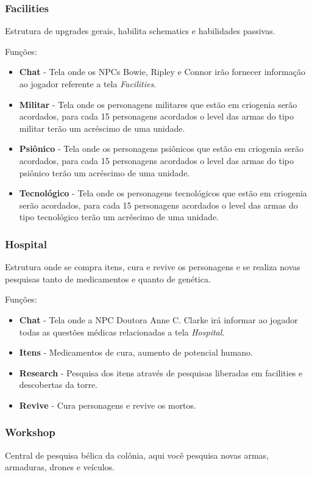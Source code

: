 \documentclass[11pt]{article} %
\begin{document}
\subsubsection{Facilities}
Estrutura de upgrades gerais, habilita schematics e habilidades passivas.

Funções:
\begin{itemize}
  \item \textbf{Chat} - Tela onde os NPCs Bowie, Ripley e Connor irão fornecer informação ao jogador referente a tela \textit{Facilities}.
  \item \textbf{Militar} - Tela onde os personagens militares que estão em criogenia serão acordados, para cada 15 personagens acordados o level das armas do tipo militar terão um acréscimo de uma unidade.
  \item \textbf{Psiônico} - Tela onde os personagens psiônicos que estão em criogenia serão acordados, para cada 15 personagens acordados o level das armas do tipo psiônico terão um acréscimo de uma unidade.
  \item \textbf{Tecnológico} - Tela onde os personagens tecnológicos que estão em criogenia serão acordados, para cada 15 personagens acordados o level das armas do tipo tecnológico terão um acréscimo de uma unidade.
\end{itemize}

\subsubsection{Hospital}
Estrutura onde se compra itens, cura e revive os personagens e se realiza novas pesquisas tanto de medicamentos e quanto de genética. 

Funções:
\begin{itemize}
  \item \textbf{Chat} - Tela onde a NPC Doutora Anne C. Clarke irá informar ao jogador todas as questões médicas relacionadas a tela \textit{Hospital}.
  \item \textbf{Itens} - Medicamentos de cura, aumento de potencial humano. 
  \item \textbf{Research} - Pesquisa dos itens através de pesquisas liberadas em facilities e descobertas da torre.
  \item \textbf{Revive} - Cura personagens e revive os mortos. 
\end{itemize}

\subsubsection{Workshop}
Central de pesquisa bélica da colônia, aqui você pesquisa novas armas, armaduras, drones e veículos.
\end{document}
